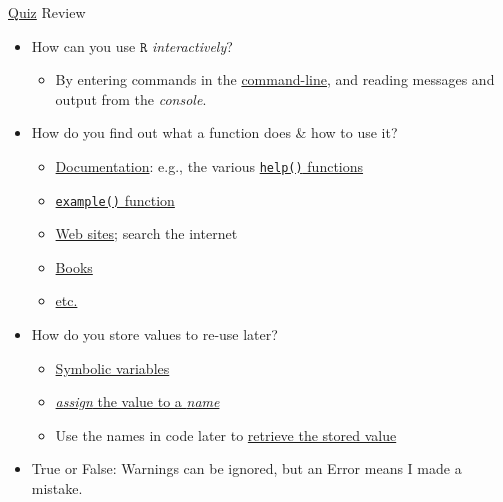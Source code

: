 \documentclass[
  11pt,
  ignorenonframetext,
]{beamer}
\providecommand{\tightlist}{%
  \setlength{\itemsep}{0pt}\setlength{\parskip}{0pt}}
\newcommand{\R}{\texttt{R}}
\begin{document}
\begin{frame}[fragile]{\protect\hyperlink{pop-quiz}{Quiz} Review}
{\begin{itemize}
  \begin{itemize}
  \tightlist
  \item
    An open-source implementation of the \texttt{S} statistical language
  \item
    Created by Ross Ihaka and Robert Gentleman (aka ``R \& R''), whose
    names both start with the letter ``R''
  \end{itemize}
\item
  How can you use \(\R\) \emph{interactively}?

  \begin{itemize}
  \tightlist
  \item
    By entering commands in the
    \href{interacting-with-R-command-line}{command-line}, and reading
    messages and output from the \emph{console}.
  \end{itemize}
\item
  How do you find out what a function does \& how to use it?

  \begin{itemize}
  \tightlist
  \item
    \protect\hyperlink{textttr-documentation}{Documentation}: e.g., the
    various
    \protect\hyperlink{textttr-documentation-find-it}{\texttt{help()}
    functions}
  \item
    \protect\hyperlink{R-documentation-read-it-end}{\texttt{example()}
    function}
  \item
    \protect\hyperlink{help-web-sites}{Web sites}; search the internet
  \item
    \protect\hyperlink{help-books}{Books}
  \item
    \protect\hyperlink{help-documentation}{etc.}
  \end{itemize}
\item
  How do you store values to re-use later?

  \begin{itemize}
  \tightlist
  \item
    \protect\hyperlink{symbolic-variables}{Symbolic variables}
  \item
    \protect\hyperlink{symbolic-variables}{\emph{assign} the value to a
    \emph{name}}
  \item
    Use the names in code later to
    \protect\hyperlink{retrieve-values}{retrieve the stored value}
  \end{itemize}
\item
  True or False: Warnings can be ignored, but an Error means I made a
  mistake.


\end{itemize}}
\end{frame}
\end{document}
